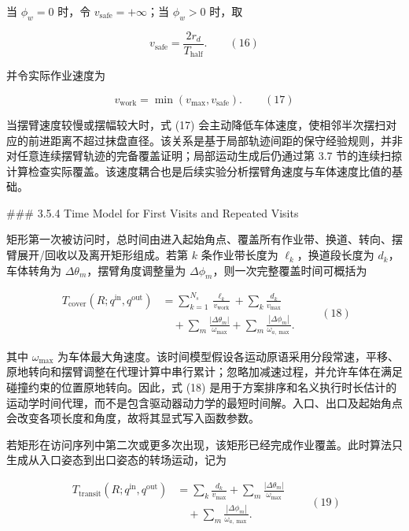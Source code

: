   

当 $\phi_w=0$ 时，令 $v_{\mathrm{safe}}=+\infty$；当 $\phi_w>0$ 时，取

$$
v_{\mathrm{safe}}=\dfrac{2r_d}{T_{\mathrm{half}}}.
\qquad(16)
$$

  

并令实际作业速度为

  

$$
v_{\mathrm{work}}=\min(v_{\max},v_{\mathrm{safe}}).
\qquad(17)
$$

  

当摆臂速度较慢或摆幅较大时，式 (17) 会主动降低车体速度，使相邻半次摆扫对应的前进距离不超过抹盘直径。该关系是基于局部轨迹间距的保守经验规则，并非对任意连续摆臂轨迹的完备覆盖证明；局部运动生成后仍通过第 3.7 节的连续扫掠计算检查实际覆盖。该速度耦合也是后续实验分析摆臂角速度与车体速度比值的基础。

  

### 3.5.4 Time Model for First Visits and Repeated Visits

  

矩形第一次被访问时，总时间由进入起始角点、覆盖所有作业带、换道、转向、摆臂展开/回收以及离开矩形组成。若第 $k$ 条作业带长度为 $\ell_k$，换道段长度为 $d_k$，车体转角为 $\Delta\theta_m$，摆臂角度调整量为 $\Delta\phi_m$，则一次完整覆盖时间可概括为

  

$$
\begin{aligned}
T_{\mathrm{cover}}(R;q^{\mathrm{in}},q^{\mathrm{out}})
&=\sum_{k=1}^{N_s}\frac{\ell_k}{v_{\mathrm{work}}}
+\sum_k\frac{d_k}{v_{\max}}\\
&\quad+\sum_m\frac{|\Delta\theta_m|}{\omega_{\max}}
+\sum_m\frac{|\Delta\phi_m|}{\omega_{a,\max}}.
\end{aligned}
\qquad(18)
$$

  

其中 $\omega_{\max}$ 为车体最大角速度。该时间模型假设各运动原语采用分段常速，平移、原地转向和摆臂调整在代理计算中串行累计；忽略加减速过程，并允许车体在满足碰撞约束的位置原地转向。因此，式 (18) 是用于方案排序和名义执行时长估计的运动学时间代理，而不是包含驱动器动力学的最短时间解。入口、出口及起始角点会改变各项长度和角度，故将其显式写入函数参数。

  

若矩形在访问序列中第二次或更多次出现，该矩形已经完成作业覆盖。此时算法只生成从入口姿态到出口姿态的转场运动，记为

  

$$
\begin{aligned}
T_{\mathrm{transit}}(R;q^{\mathrm{in}},q^{\mathrm{out}})
&=\sum_k\frac{d_k}{v_{\max}}
+\sum_m\frac{|\Delta\theta_m|}{\omega_{\max}}\\
&\quad+\sum_m\frac{|\Delta\phi_m|}{\omega_{a,\max}}.
\end{aligned}
\qquad(19)
$$

